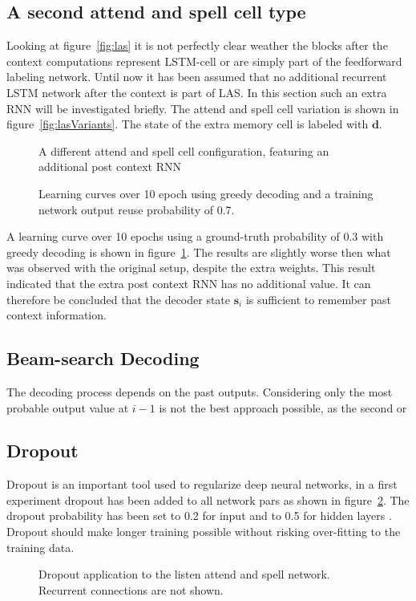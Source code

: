 \subsection{A second attend and spell cell type}
Looking at figure~\ref{fig:las} it is not perfectly clear weather the blocks after the context computations represent LSTM-cell or are simply part of the feedforward labeling network. Until now it has been assumed that no additional recurrent LSTM network after the context is part of LAS. In this section such an extra RNN will be investigated briefly. The attend and spell cell variation is shown in figure~\ref{fig:lasVariants}. The state of the extra memory cell is labeled with $\mathbf{d}$.
\begin{figure}
\centering

\caption{A different attend and spell cell configuration, featuring an additional post context RNN}
\label{fig:lasVariants}

\caption{Learning curves over 10 epoch using greedy decoding and a training network output reuse probability of 0.7.}
\label{fig:variantResult}
\end{figure}
A learning curve over 10 epochs using a ground-truth probability of 0.3 with greedy decoding is shown in figure~\ref{fig:variantResult}. The results are slightly worse then what was observed with the original setup, despite the extra weights. This result indicated that the extra post context RNN has no additional value.
It can therefore be concluded that the decoder state $\mathbf{s}_i$ is sufficient to remember past context information.

\subsection{Beam-search Decoding}
The decoding process depends on the past outputs. Considering only the most probable output value at $i-1$ is not the best approach possible, as the second or 




\subsection{Dropout}
Dropout is an important tool used to regularize deep neural networks, in a first experiment dropout has been added to all network pars as shown in figure~\ref{fig:lasDropout}. The dropout probability has been set to 0.2 for input and to 0.5 for hidden layers \cite{Srivastava2014}. Dropout should make longer training possible without risking over-fitting to the training data.

\begin{figure}
\centering

\caption{Dropout application to the listen attend and spell network. Recurrent connections are not shown.}
\label{fig:lasDropout}
\end{figure}




